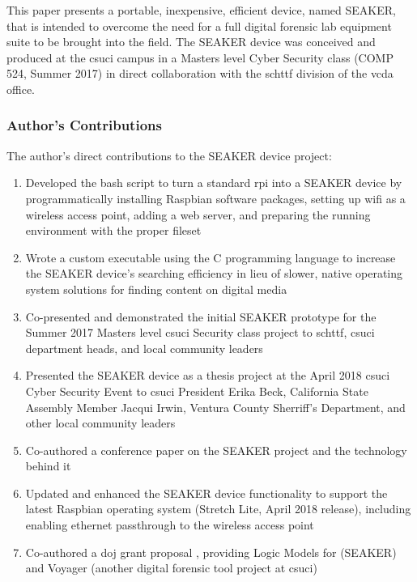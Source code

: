 \documentclass[12pt]{article}
\begin{document}
This paper presents a portable, inexpensive, efficient device, named SEAKER,
that is intended to overcome the need for a full digital
forensic lab equipment suite to be brought into the field.  The SEAKER device was conceived and 
produced at the \gls{csuci} campus in a 
Masters level Cyber Security class (COMP 524, Summer 2017) in direct collaboration with the
\gls{schttf} division of the \gls{vcda} office.\\


\subsubsection{Author's Contributions}
The author's direct contributions to the SEAKER device project:
\begin{enumerate}
  \item Developed the bash script to turn a standard \gls{rpi} into a
  SEAKER device by programmatically
  installing Raspbian software packages, setting up \gls{wifi} as a wireless access point, adding a web server,
  and preparing the running environment with the proper fileset
  \item Wrote a custom executable using the C programming language to increase the SEAKER device's 
  searching efficiency in lieu of slower, native operating
  system solutions for finding content on digital media
  \item Co-presented and demonstrated the initial SEAKER prototype for the Summer 2017 Masters level \gls{csuci}
  Security class project to \gls{schttf}, \gls{csuci} department heads, and local community leaders
  \item Presented the SEAKER device as a thesis project at the April 2018 \gls{csuci} Cyber Security Event
  to \gls{csuci} President
  Erika Beck, California State Assembly Member Jacqui Irwin, Ventura County Sherriff's Department,
  and other local community leaders
  \item Co-authored a conference paper \cite{gentry2018seaker} on the SEAKER project and the technology behind it
  \item Updated and enhanced the SEAKER device functionality to support the latest Raspbian operating system (Stretch
  Lite, April 2018 release), including enabling ethernet passthrough to the wireless access point
  \item Co-authored a \gls{doj} grant proposal \cite{soltys2018dojgrant}, providing Logic Models
  for (SEAKER) and Voyager (another digital forensic tool project at \gls{csuci})
\end{enumerate}
\end{document}
